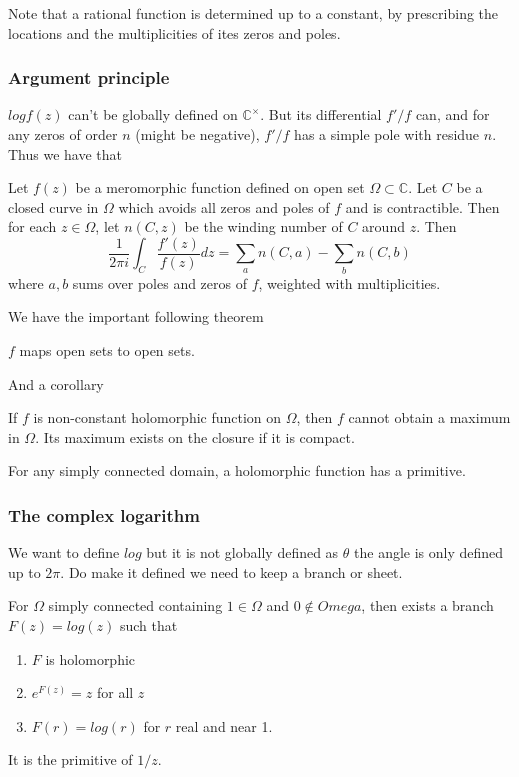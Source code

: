 \documentclass[main.tex]{subfiles}
\begin{document}
Note that a rational function is determined up to a constant, by prescribing the locations and the multiplicities of ites zeros and poles.

\subsubsection{Argument principle}
$log f(z)$ can't be globally defined on $\mathbb{C}^\times$. But its differential $f'/f$ can, and for any zeros of order $n$ (might be negative), $f'/f$ has a simple pole with residue $n$. Thus we have that

\begin{theorem}
Let $f(z)$ be a meromorphic function defined on open set $\Omega \subset \mathbb{C}$. Let $C$ be a closed curve in $\Omega$ which avoids all zeros and poles of $f$ and is contractible. Then for each $z \in \Omega$, let $n(C,z)$ be the winding number of $C$ around $z$. Then 
$$
\frac{1}{2\pi i} \int_C \frac{f'(z)}{f(z)} dz = \sum_a n(C,a) - \sum_b n(C,b)
$$
where $a, b$ sums over poles and zeros of $f$, weighted with multiplicities.
\end{theorem}

We have the important following theorem 
\begin{theorem}
$f$ maps open sets to open sets.
\end{theorem}

And a corollary 
\begin{corollary}
If $f$ is non-constant holomorphic function on $\Omega$, then $f$ cannot obtain a maximum in $\Omega$. Its maximum exists on the closure if it is compact.
\end{corollary}

For any simply connected domain, a holomorphic function has a primitive. 

\subsubsection{The complex logarithm}
We want to define $log$ but it is not globally defined as $\theta$ the angle is only defined up to $2\pi$. Do make it defined we need to keep a branch or sheet.

\begin{theorem}
For $\Omega$ simply connected containing $1 \in \Omega$ and $0 \nin Omega$, then exists a branch $F(z) = log(z)$ such that
\begin{enumerate}
    \item $F$ is holomorphic
    \item $e^{F(z)} = z$ for all $z$
    \item $F(r) = log(r)$ for $r$ real and near 1.
\end{enumerate}
\end{theorem}
It is the primitive of $1/z$.
\end{document}

